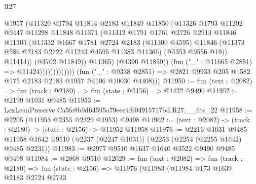 \begin{lexlean}{R27}
\begin{coremodule}
                                    @1957
                                    (@11320
                                      @1794
                                      @11814
                                      @2183
                                      @11849
                                      @11850
                                      (@11326
                                        @1793
                                        @11202
                                        @9447
                                        @11298
                                        @11848
                                        @11371
                                        (@11312
                                          @1791
                                          @1761
                                          @2726
                                          @2913
                                          @11846
                                          @11303
                                          (@11332
                                            @1667
                                            @1781
                                            @2724
                                            @2183
                                            (@11300 @4595)
                                            @11846
                                            (@11373 @586 @2183 @2722 @11243 @4595 @11383 @11366)
                                            (@5353 @9556 @19))
                                          @11414))
                                      (@3702 @11849))
                                    @11365)
                                  (@4390 @11850))
                                (fun ("_" : @11665 @2851) => @11424)))))))))))))
        (fun ("_" : @9338 @2851) =>
        @2821 @9933 @205 @1582 @175 @2183 @2183 @1957 @4106 @10030 @4408)))
@11950 := fun (text : @2082) => fun (track : @2180) => fun (state : @2156) => @4422 @9490
@11952 := @2199 @1031 @9485
@11953 := LexLeanPreserve.Ca5fe8b9d64595a79eee4f004915717bd.R27.__fits_22
@11958 := @2205 (@11953 @2355 @2329 @1953) @9498
@11962 := (text : @2082) -> (track : @2180) -> (state : @2156) -> @11952 @11958
@11976 := @2216
    @1031
    @9485
    @11958
    @1642
    @9510
    (@2237 (@2247 @1031))
    (@2253 (@2254 (@2255 @1642) @9485 @2231))
@11983 := @2977 @9510 @1637 @1640 @3522 @9490 @9485 @9498
@11984 := @2868 @9510
@12029 := fun (text : @2082) =>
  fun (track : @2180) =>
  fun (state : @2156) =>
  @11976
    (@11983
      (@11984
        @173
        @1639
        @2183
        @2724
        @2733

\end{coremodule}
\end{lexlean}
